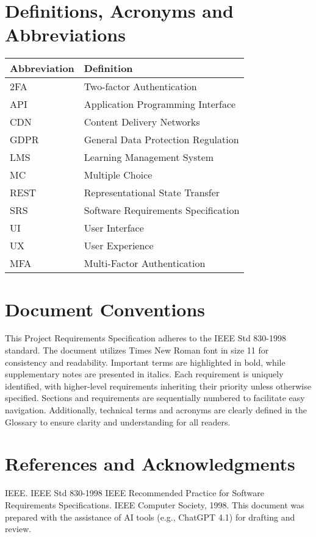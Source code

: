 \documentclass[a4paper, 11pt]{scrreprt}
\begin{document}
\section{Definitions, Acronyms and Abbreviations}
\begin{center}
    \begin{tabularx}{\textwidth}{lX}
        \toprule
        \textbf{Abbreviation} & \textbf{Definition} \\
        \midrule
        2FA & Two-factor Authentication \\
        API & Application Programming Interface \\
        CDN & Content Delivery Networks \\
        GDPR & General Data Protection Regulation \\
        LMS & Learning Management System \\
        MC & Multiple Choice \\
        REST & Representational State Transfer \\
        SRS & Software Requirements Specification \\
        UI & User Interface \\
        UX & User Experience \\
        MFA & Multi-Factor Authentication \\
        \bottomrule
    \end{tabularx}
\end{center}

\section{Document Conventions}
This Project Requirements Specification adheres to the IEEE Std 830-1998 standard. The document utilizes Times New Roman font in size 11 for consistency and readability. Important terms are highlighted in bold, while supplementary notes are presented in italics. Each requirement is uniquely identified, with higher-level requirements inheriting their priority unless otherwise specified. Sections and requirements are sequentially numbered to facilitate easy navigation. Additionally, technical terms and acronyms are clearly defined in the Glossary to ensure clarity and understanding for all readers.

\section{References and Acknowledgments}
IEEE. IEEE Std 830-1998 IEEE Recommended Practice for Software Requirements Specifications. IEEE Computer Society, 1998.
This document was prepared with the assistance of AI tools (e.g., ChatGPT 4.1) for drafting and review.
\end{document}
